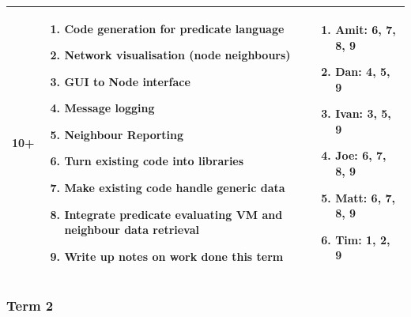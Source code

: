 \begin{center}
\begin{longtable}{| l | p{9cm} | p{3.5cm} |}
	10+ & \begin{enumerate}
			\item Code generation for predicate language
			\item Network visualisation (node neighbours)
			\item GUI to Node interface
			\item Message logging
			\item Neighbour Reporting
			\item Turn existing code into libraries
			\item Make existing code handle generic data
			\item Integrate predicate evaluating VM and neighbour data retrieval
			\item Write up notes on work done this term
		\end{enumerate} &
	\begin{enumerate}
		\item[] Amit: 6, 7, 8, 9
		\item[] Dan: 4, 5, 9
		\item[] Ivan: 3, 5, 9
		\item[] Joe: 6, 7, 8, 9
		\item[] Matt: 6, 7, 8, 9
		\item[] Tim: 1, 2, 9
	\end{enumerate}
	\\ \hline
	
	\end{longtable}
\end{center}

\subsubsection*{Term 2}

